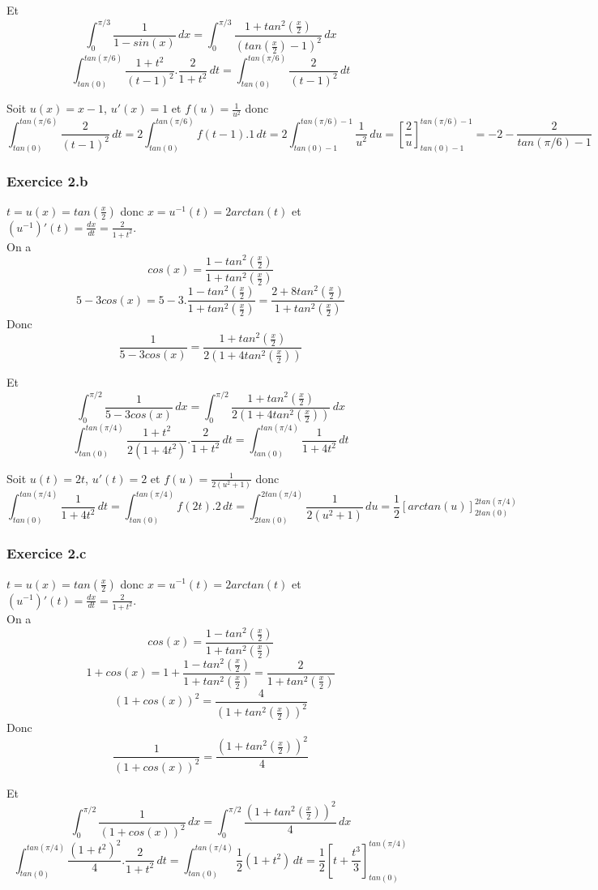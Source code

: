 \documentclass[]{book}
\theoremstyle{definition}
\begin{document}
Et
$$\int_0^{\pi/3}{\frac{1}{1-sin(x)}\,dx} = \int_0^{\pi/3}{\frac{1+tan^2(\frac{x}{2})}{(tan(\frac{x}{2})-1)^2}\,dx}$$
$$\int_{tan(0)}^{tan(\pi/6)}{\frac{1+t^2}{(t-1)^2}.\frac{2}{1+t^2}\,dt} = \int_{tan(0)}^{tan(\pi/6)}{\frac{2}{(t-1)^2}\,dt}$$

Soit $u(x)=x-1$, $u'(x)=1$ et $f(u) = \frac{1}{u^2}$ donc
$$\int_{tan(0)}^{tan(\pi/6)}{\frac{2}{(t-1)^2}\,dt} = 2\int_{tan(0)}^{tan(\pi/6)}{f(t-1).1\,dt}=2\int_{tan(0)-1}^{tan(\pi/6)-1}{\frac{1}{u^2}\,du} = [\frac{2}{u}]_{tan(0)-1}^{tan(\pi/6)-1} = -2 - \frac{2}{tan(\pi/6)-1}$$


\subsubsection*{Exercice 2.b}
$t = u(x) = tan(\frac{x}{2})$ donc $x = u^{-1}(t) = 2arctan(t)$ et $(u^{-1})'(t) = \frac{dx}{dt} = \frac{2}{1+t^2}$.\\
On a 
$$cos(x)=\frac{1-tan^2(\frac{x}{2})}{1+tan^2(\frac{x}{2})}$$
$$5-3cos(x)=5-3.\frac{1-tan^2(\frac{x}{2})}{1+tan^2(\frac{x}{2})} = \frac{2+8tan^2(\frac{x}{2})}{1+tan^2(\frac{x}{2})}$$
Donc
$$\frac{1}{5-3cos(x)} = \frac{1+tan^2(\frac{x}{2})}{2(1+4tan^2(\frac{x}{2}))}$$

Et
$$\int_{0}^{\pi/2}{\frac{1}{5-3cos(x)}\,dx} = \int_{0}^{\pi/2}{\frac{1+tan^2(\frac{x}{2})}{2(1+4tan^2(\frac{x}{2}))}\,dx}$$
$$\int_{tan(0)}^{tan(\pi/4)}{\frac{1+t^2}{2(1+4t^2)}.\frac{2}{1+t^2}\,dt} = \int_{tan(0)}^{tan(\pi/4)}{\frac{1}{1+4t^2}\,dt}$$

Soit $u(t)=2t$, $u'(t)=2$ et $f(u)=\frac{1}{2(u^2+1)}$ donc
$$\int_{tan(0)}^{tan(\pi/4)}{\frac{1}{1+4t^2}\,dt} = \int_{tan(0)}^{tan(\pi/4)}{f(2t).2\,dt} = \int_{2tan(0)}^{2tan(\pi/4)}{\frac{1}{2(u^2+1)}\,du} = \frac{1}{2}[arctan(u)]_{2tan(0)}^{2tan(\pi/4)}$$


\subsubsection*{Exercice 2.c}
$t = u(x) = tan(\frac{x}{2})$ donc $x = u^{-1}(t) = 2arctan(t)$ et $(u^{-1})'(t) = \frac{dx}{dt} = \frac{2}{1+t^2}$.\\
On a 
$$cos(x)=\frac{1-tan^2(\frac{x}{2})}{1+tan^2(\frac{x}{2})}$$
$$1+cos(x)=1+\frac{1-tan^2(\frac{x}{2})}{1+tan^2(\frac{x}{2})} = \frac{2}{1+tan^2(\frac{x}{2})}$$
$$(1+cos(x))^2 = \frac{4}{(1+tan^2(\frac{x}{2}))^2}$$
Donc
$$\frac{1}{(1+cos(x))^2}=\frac{(1+tan^2(\frac{x}{2}))^2}{4}$$

Et
$$\int_{0}^{\pi/2}{\frac{1}{(1+cos(x))^2}\,dx} = \int_{0}^{\pi/2}{\frac{(1+tan^2(\frac{x}{2}))^2}{4}\,dx}$$
$$\int_{tan(0)}^{tan(\pi/4)}{\frac{(1+t^2)^2}{4}.\frac{2}{1+t^2}\,dt} = \int_{tan(0)}^{tan(\pi/4)}{\frac{1}{2}(1+t^2)\,dt} = \frac{1}{2}[t+\frac{t^3}{3}]_{tan(0)}^{tan(\pi/4)}$$
\end{document}
